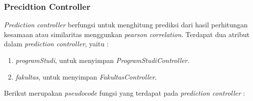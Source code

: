 \subsubsection{Precidtion Controller}
\label{subsec:prediction}

\textit{Prediction controller} berfungsi untuk menghitung prediksi dari hasil perhitungan kesamaan atau similaritas menggunkan \textit{pearson correlation}. Terdapat dua atribut dalam \textit{prediction controller}, yaitu :

\begin{enumerate}
    \item \textit{programStudi}, untuk menyimpan \textit{ProgramStudiController}.
    
    \item \textit{fakultas}, untuk menyimpan \textit{FakultasController}.
\end{enumerate}

Berikut merupakan \textit{pseudocode} fungsi yang terdapat pada \textit{prediction controller} :

